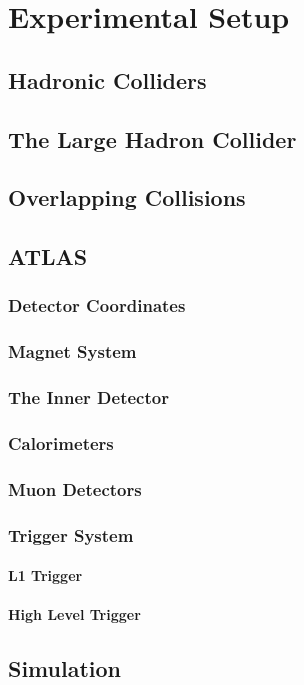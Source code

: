 \chapter{Experimental Setup}
\section{Hadronic Colliders}
\section{The Large Hadron Collider}
\section{Overlapping Collisions}
\section{ATLAS}
\subsection{Detector Coordinates}
\subsection{Magnet System}
\subsection{The Inner Detector}
\subsection{Calorimeters}
\subsection{Muon Detectors}
\subsection{Trigger System}
\subsubsection{L1 Trigger}
\subsubsection{High Level Trigger}
\section{Simulation}




